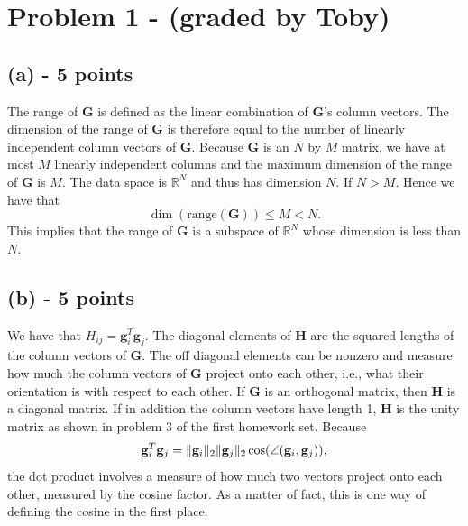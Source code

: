 \documentclass[11pt]{article}
\begin{document}
\lstset{language=Matlab,%
  breaklines=true,%
  morekeywords={matlab2tikz},
  keywordstyle=\color{blue},%
  morekeywords=[2]{1}, keywordstyle=[2]{\color{black}},
  identifierstyle=\color{black},%
  stringstyle=\color{mylilas},
  commentstyle=\color{mygreen},%
  showstringspaces=false,%
  numbers=left,%
  numberstyle={\tiny \color{black}},%
  numbersep=9pt, %
  emph=[1]{for,end,break},emphstyle=[1]\color{red}, %
}




\section*{Problem 1 - (graded by Toby)}

\subsection*{(a) - 5 points}
The range of $\mathbf{G}$ is defined as the linear combination of $\mathbf{G}$'s column vectors. The dimension of the range of $\mathbf{G}$ is therefore equal to the number of linearly independent column vectors of $\mathbf{G}$. Because $\mathbf{G}$ is an $N$ by $M$ matrix, we have at most $M$ linearly independent columns and the maximum dimension of the range of $\mathbf{G}$ is $M$. The data space is $\mathbb{R}^N$ and thus has dimension $N$. If $N> M$. Hence we have that 
\begin{equation}
\dim (\text{range}(\mathbf{G})) \leq M < N.
\end{equation}
This implies that the range of $\mathbf{G}$ is a subspace of $\mathbb{R}^N$ whose dimension is less than $N$.

\subsection*{(b) - 5 points}
We have that $H_{ij} = \mathbf{g}_i^T\mathbf{g}_j$. The diagonal elements of $\mathbf{H}$ are the squared lengths of the column vectors of $\mathbf{G}$. The off diagonal elements can be nonzero and measure how much the column vectors of $\mathbf{G}$ project onto each other, i.e., what their orientation is with respect to each other. If $\mathbf{G}$ is an orthogonal matrix, then $\mathbf{H}$ is a diagonal matrix. If in addition the column vectors have length 1, $\mathbf{H}$ is the unity matrix as shown in problem 3 of the first homework set. Because 
\begin{equation}
\mathbf{g}_i^T\mathbf{g}_j = \lVert\mathbf{g}_i\rVert_2\lVert\mathbf{g}_j\rVert_2\cos(\angle(\mathbf{g}_i,\mathbf{g}_j)),
\end{equation}
the dot product involves a measure of how much two vectors project onto each other, measured by the cosine factor. As a matter of fact, this is one way of defining the cosine in the first place.
\end{document}
